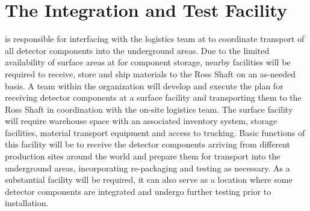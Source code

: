 \section{The Integration and Test Facility}
\label{sec:fdsp-coord-integ-test}

  is responsible for interfacing with the
 logistics team at \surf to coordinate transport of all
detector components into the underground areas.  Due to the limited
availability of surface areas at \surf for component storage, nearby
facilities will be required to receive, store and ship materials to
the Ross Shaft on an as-needed basis. A team within the 
organization will %
develop and execute the plan for
receiving detector components at a surface facility and transporting
them to the Ross Shaft in coordination with the on-site 
logistics team.  The surface facility will require warehouse space
with an associated inventory system, storage facilities, material
transport equipment and access to trucking.  Basic functions of this
facility will be to receive the detector components arriving from
different production sites around the world and prepare them for
transport into the underground areas, incorporating re-packaging and
testing as necessary. As a substantial facility will %
be
required, it can also serve as a location where some detector
components are integrated and undergo further testing prior to
installation.

